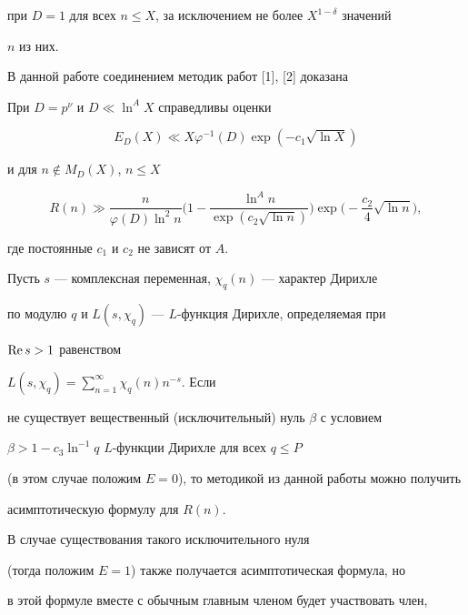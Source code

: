 при $D=1$ для всех $n\le X$, за исключением не более $X^{1-\delta}$ значений


$n$ из них.





В данной работе соединением методик работ [1], [2] доказана





\begin{thm}


При $D=p^{\nu}$ и $D\ll \ln^A X$ справедливы оценки


$$


E_D(X)\ll X\varphi^{-1}(D)\exp(-c_1\sqrt{\ln X})


$$


и для $n\notin M_D(X)$, $n\le X$


$$


R(n)\gg\frac{n}{\varphi(D)\ln^2 n}


\bigg(1-\frac{\ln^A n}{\exp(c_2\sqrt{\ln n})}\bigg)


\exp\bigg(-\frac{c_2}{4}\sqrt{\ln n}\bigg), 


$$


где постоянные $c_1$ и $c_2$ не зависят от $A$.


\end{thm}





Пусть $s$ --- комплексная переменная, $\chi_q(n)$ --- характер Дирихле


по модулю $q$ и $L(s,\chi_q)$ --- $L$-функция Дирихле, определяемая при


$\operatorname{Re} s>1$ равенством


$L(s,\chi_q)=\sum\limits_{n=1}^\infty\chi_q(n)n^{-s}$. Если 


не существует вещественный (исключительный) нуль $\beta$ с условием


$\beta>1-c_3\ln^{-1}q$\; $L$-функции Дирихле для всех $q\le P$


(в этом случае положим $E=0$), то методикой из данной работы можно получить 


асимптотическую формулу для $R(n)$.


В случае существования такого исключительного нуля


(тогда положим $E=1$) также получается асимптотическая формула, но


в этой формуле вместе с обычным главным членом будет участвовать член,


